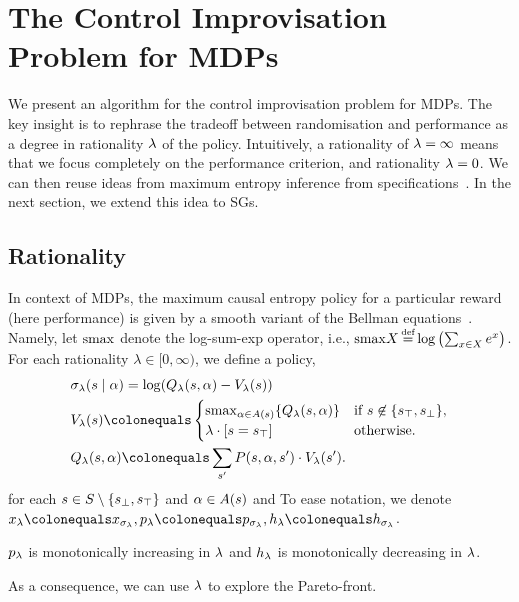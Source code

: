 
\section{The Control Improvisation Problem for MDPs}
\label{sec:mdps}

We present an algorithm for the control improvisation problem for
MDPs. The key insight is to rephrase the tradeoff between
randomisation and performance as a degree in rationality $\lambda$ of the
policy. Intuitively, a rationality of $\lambda = \infty$ means that we
focus completely on the performance criterion, and rationality $\lambda =
0$. We can then reuse ideas from maximum entropy inference from
specifications~\cite{DBLP:conf/cav/Vazquez-Chanlatte20}.  In the next
section, we extend this idea to SGs.

\subsection{Rationality}

\noindent
In context of MDPs, the maximum causal entropy policy for a particular
reward (here performance) is given by a smooth variant of the Bellman
equations~\cite{mceThesis}. Namely, let $\mathrm{smax}{}$ denote the
log-sum-exp operator, i.e., $\smoothmax{X} \eqdef \log \left(
\sum_{x\in X} e^x \right)$. For each rationality $\lambda \in [0,
\infty)$, we define a policy,
 \begin{align}
   &\sched_\rat(s\mid \act) = \log( Q_\rat(s,\act) - V_\rat(s))  \\
	& V_\rat(s) \colonequals  \begin{cases} \smoothmax_{\act \in \EnAct(s)}{\{  Q_\rat(s,\act) \}} & \text{if }s \not\in \{ \target, \sink \}, \\ \lambda  \cdot \indicator{s = \target} & \text{otherwise.}  \end{cases}\\ 
	& Q_\rat(s, \act) \colonequals \sum_{s'} P(s,\act,s') \cdot V_\rat(s').
 \end{align}
 for each $s \in S \setminus \{ s_{\bot}, s_{\top} \}$ and $\alpha \in A(s)$ and
To ease notation, we denote $x_\rat \colonequals x_{\sched_\rat}, \scp_\rat \colonequals \scp_{\sched_\rat}, \rndp_\rat \colonequals \rndp_{\sched_\rat}$.

\begin{proposition}
$p_\lambda$ is monotonically increasing in $\lambda$ and $h_\lambda$ is monotonically decreasing in $\lambda$.	
\end{proposition}
As a consequence, we can use $\lambda$ to explore the Pareto-front. 


